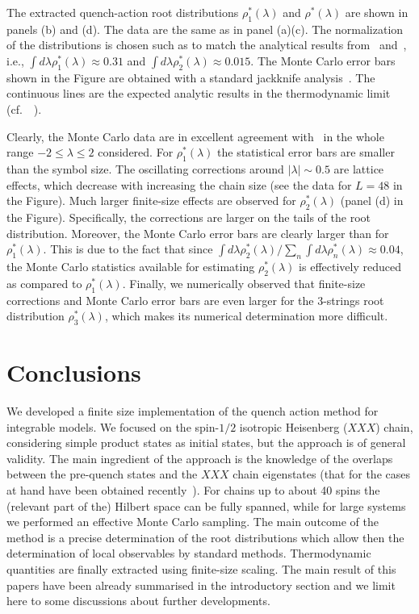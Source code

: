 \documentclass[11pt]{iopart}
\begin{document}
The extracted quench-action root distributions $\rho^*_1(\lambda)$ and $\rho^*(\lambda)$ 
are shown in panels (b) and (d). The data are the same as in panel (a)(c). The normalization 
of the distributions is chosen such as to match the analytical results from~ 
and~, i.e., $\int d\lambda\rho^*_1(\lambda)\approx0.31$ and $\int d\lambda
\rho^*_2(\lambda)\approx0.015$. The Monte Carlo error bars shown in the Figure are obtained 
with a standard jackknife analysis~\cite{quenouille-1949,wolff-2004}. 
The continuous lines are the expected analytic results in the thermodynamic limit 
(cf.~~). 

Clearly, the Monte Carlo data are in excellent agreement with~ in the whole 
range $-2\le\lambda\le2$ considered. For $\rho^*_1(\lambda)$ the statistical error bars 
are smaller than the symbol size. The oscillating corrections around $|\lambda|\sim0.5$ 
are lattice effects, which decrease with increasing the chain size 
(see the data for $L=48$ in the Figure). Much larger finite-size effects are observed for 
$\rho^*_2(\lambda)$ (panel (d) in the Figure). Specifically, the corrections are larger on 
the tails of the root distribution. Moreover, the Monte Carlo error bars are clearly 
larger than for $\rho_1^*(\lambda)$. This is due to the fact that since $\int d\lambda
\rho^*_2(\lambda)/\sum_n\int d\lambda\rho_n^*(\lambda)\approx 0.04$, the Monte Carlo 
statistics available for estimating $\rho_2^*(\lambda)$ is effectively reduced as 
compared to $\rho_1^*(\lambda)$. Finally, we numerically observed that finite-size 
corrections and Monte Carlo error bars are even larger for the $3$-strings root 
distribution $\rho^*_3(\lambda)$, which makes its numerical determination more difficult. 


\section{Conclusions}
\label{conclusions}

We developed a finite size implementation of the quench action method for integrable models. 
We focused on the spin-$1/2$ isotropic Heisenberg ($XXX$) chain, 
considering simple product states as initial states, but the approach is of general validity. 
The main ingredient of the approach is the knowledge of the overlaps between the pre-quench
states and the $XXX$ chain  eigenstates (that for the cases at hand have been obtained recently~\cite{
pozsgay-2014a,brockmann-2014,brockmann-2014b,brockmann-2014c,piroli-2014}). 
%
For chains up to about 40 spins the (relevant part of the) Hilbert space can be fully spanned, while 
for large systems we performed an effective Monte Carlo sampling. 
The main outcome of the method is a precise determination of the root distributions which allow
then the determination of local observables by standard methods. 
Thermodynamic quantities are finally extracted using finite-size scaling. 
The main result of this papers have been already summarised in the introductory section and 
we limit here to some discussions about further developments. 
\end{document}
